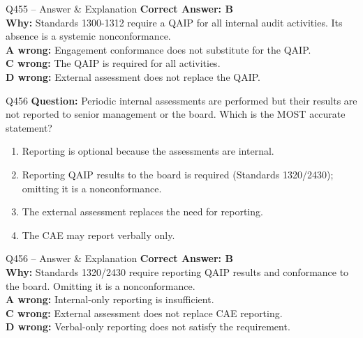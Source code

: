 \documentclass[aspectratio=169,10pt]{beamer}
\begin{document}
	\begin{frame}[t]{Q455 -- Answer \& Explanation}
		\small
		\textbf{Correct Answer: B} \\[4pt]
		\textbf{Why:} Standards 1300-1312 require a QAIP for all internal audit activities. Its absence is a systemic nonconformance. \\[4pt]
		\textbf{A wrong:} Engagement conformance does not substitute for the QAIP. \\[2pt]
		\textbf{C wrong:} The QAIP is required for all activities. \\[2pt]
		\textbf{D wrong:} External assessment does not replace the QAIP.
	\end{frame}
	
	\begin{frame}[t]{Q456}
		\small
		\textbf{Question:} Periodic internal assessments are performed but their results are not reported to senior management or the board. Which is the MOST accurate statement?
		\begin{enumerate}[label=\Alph*.,itemsep=1pt,topsep=2pt]
			\item Reporting is optional because the assessments are internal.
			\item Reporting QAIP results to the board is required (Standards 1320/2430); omitting it is a nonconformance.
			\item The external assessment replaces the need for reporting.
			\item The CAE may report verbally only.
		\end{enumerate}
	\end{frame}
	
	\begin{frame}[t]{Q456 -- Answer \& Explanation}
		\small
		\textbf{Correct Answer: B} \\[4pt]
		\textbf{Why:} Standards 1320/2430 require reporting QAIP results and conformance to the board. Omitting it is a nonconformance. \\[4pt]
		\textbf{A wrong:} Internal-only reporting is insufficient. \\[2pt]
		\textbf{C wrong:} External assessment does not replace CAE reporting. \\[2pt]
		\textbf{D wrong:} Verbal-only reporting does not satisfy the requirement.
	\end{frame}
	
\end{document}

